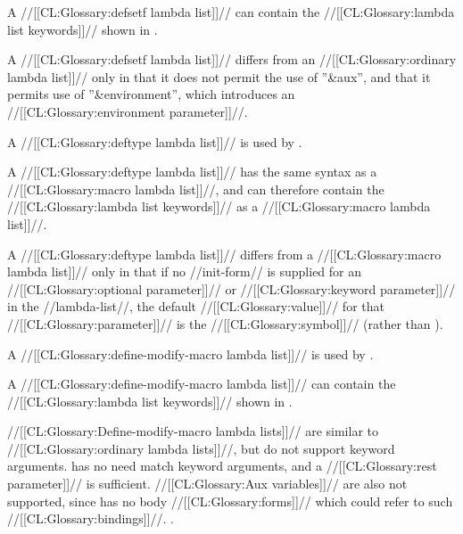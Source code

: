 A //[[CL:Glossary:defsetf lambda list]]// can contain the //[[CL:Glossary:lambda list keywords]]// shown
in \thenextfigure.



A //[[CL:Glossary:defsetf lambda list]]// differs from an //[[CL:Glossary:ordinary lambda list]]// 
only in that it does not permit the use of ''&aux'', 
and that it permits use of ''&environment'', 
     which introduces an //[[CL:Glossary:environment parameter]]//.

\endsubSection%


A //[[CL:Glossary:deftype lambda list]]// is used by .

A //[[CL:Glossary:deftype lambda list]]// has the same syntax as a //[[CL:Glossary:macro lambda list]]//,
and can therefore contain the //[[CL:Glossary:lambda list keywords]]// as a //[[CL:Glossary:macro lambda list]]//.

A //[[CL:Glossary:deftype lambda list]]// differs from a //[[CL:Glossary:macro lambda list]]// 
only in that if no //init-form// is supplied for an //[[CL:Glossary:optional parameter]]//
or //[[CL:Glossary:keyword parameter]]// in the //lambda-list//, the default //[[CL:Glossary:value]]// 
for that //[[CL:Glossary:parameter]]// is the //[[CL:Glossary:symbol]]// \misc{*} (rather than \nil).



\endsubSection%





A //[[CL:Glossary:define-modify-macro lambda list]]// is used by 
.

A //[[CL:Glossary:define-modify-macro lambda list]]// can contain the 
//[[CL:Glossary:lambda list keywords]]// shown in \thenextfigure.


//[[CL:Glossary:Define-modify-macro lambda lists]]// are similar to 
//[[CL:Glossary:ordinary lambda lists]]//, but do not support keyword arguments.
 has no need match keyword arguments, and
a //[[CL:Glossary:rest parameter]]// is sufficient.  //[[CL:Glossary:Aux variables]]// are also
not supported, since  has no body //[[CL:Glossary:forms]]//
which could refer to such //[[CL:Glossary:bindings]]//.  .

